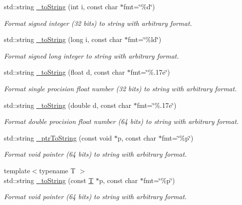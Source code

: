 \begin{DoxyCompactItemize}
std\+::string \hyperlink{group___d_d4_h_e_p___x_m_l_ga3db5e3893d601405e4881f4e59aab45a}{\+\_\+to\+String} (int i, const char $\ast$fmt=\char`\"{}\%d\char`\"{})
\begin{DoxyCompactList}\small\item\em Format signed integer (32 bits) to string with arbitrary format. \end{DoxyCompactList}\item 
std\+::string \hyperlink{group___d_d4_h_e_p___x_m_l_gab11cb9a1d8aa1ca280f2d88345983838}{\+\_\+to\+String} (long i, const char $\ast$fmt=\char`\"{}\%ld\char`\"{})
\begin{DoxyCompactList}\small\item\em Format signed long integer to string with arbitrary format. \end{DoxyCompactList}\item 
std\+::string \hyperlink{group___d_d4_h_e_p___x_m_l_ga5fe476c5280899829d9defb4386524a9}{\+\_\+to\+String} (float d, const char $\ast$fmt=\char`\"{}\%.\+17e\char`\"{})
\begin{DoxyCompactList}\small\item\em Format single procision float number (32 bits) to string with arbitrary format. \end{DoxyCompactList}\item 
std\+::string \hyperlink{group___d_d4_h_e_p___x_m_l_ga101954caf40eafb6b0bc58223764a3d4}{\+\_\+to\+String} (double d, const char $\ast$fmt=\char`\"{}\%.\+17e\char`\"{})
\begin{DoxyCompactList}\small\item\em Format double procision float number (64 bits) to string with arbitrary format. \end{DoxyCompactList}\item 
std\+::string \hyperlink{group___d_d4_h_e_p___x_m_l_ga38094fef4f65786fdece09b69b41d07b}{\+\_\+ptr\+To\+String} (const void $\ast$p, const char $\ast$fmt=\char`\"{}\%p\char`\"{})
\begin{DoxyCompactList}\small\item\em Format void pointer (64 bits) to string with arbitrary format. \end{DoxyCompactList}\item 
{\footnotesize template$<$typename T $>$ }\\std\+::string \hyperlink{group___d_d4_h_e_p___x_m_l_gaa022e4ea896faaded8ae9dec1ee003da}{\+\_\+to\+String} (const \hyperlink{class_t}{T} $\ast$p, const char $\ast$fmt=\char`\"{}\%p\char`\"{})
\begin{DoxyCompactList}\small\item\em Format void pointer (64 bits) to string with arbitrary format. \end{DoxyCompactList}\item 

\end{DoxyCompactItemize}
